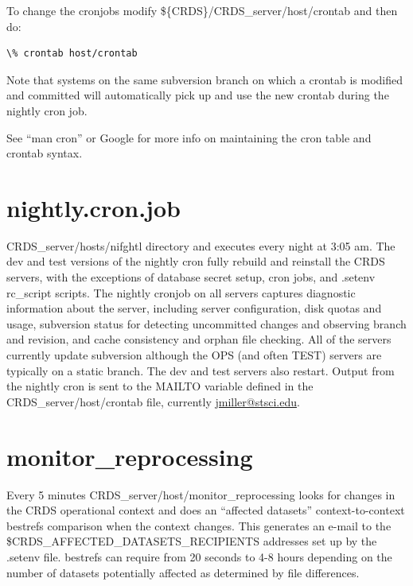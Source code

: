 \documentclass[letterpaper,10pt,english]{sphinxmanual}
\begin{document}
To change the cronjobs modify \$\{CRDS\}/CRDS\_server/host/crontab and then do:

\begin{Verbatim}[commandchars=\\\{\}]
\% crontab host/crontab
\end{Verbatim}

Note that systems on the same subversion branch on which a crontab is modified and committed will automatically pick
up and use the new crontab during the nightly cron job.

See ``man cron'' or Google for more info on maintaining the cron table and crontab syntax.


\section{nightly.cron.job}
\label{server_guide:nightly-cron-job}
CRDS\_server/hosts/nifghtl directory and executes every night at 3:05 am.  The dev and test versions
of the nightly cron fully rebuild and reinstall the CRDS servers,  with the exceptions of database secret setup,
cron jobs, and .setenv rc\_script scripts.   The nightly cronjob on all servers captures diagnostic information about
the server,  including server configuration, disk quotas and usage, subversion status for detecting uncommitted
changes and observing branch and revision, and cache consistency and orphan file checking.   All of the servers
currently update subversion although the OPS (and often TEST) servers are typically on a static branch.   The dev
and test servers also restart.  Output from the nightly cron is sent to the MAILTO variable defined in the
CRDS\_server/host/crontab file,  currently \href{mailto:jmiller@stsci.edu}{jmiller@stsci.edu}.


\section{monitor\_reprocessing}
\label{server_guide:id2}
Every 5 minutes CRDS\_server/host/monitor\_reprocessing looks for changes in the CRDS operational context and
does an ``affected datasets'' context-to-context bestrefs comparison when the context changes.   This generates
an e-mail to the \$CRDS\_AFFECTED\_DATASETS\_RECIPIENTS addresses set up by the .setenv file.   bestrefs can require
from 20 seconds to 4-8 hours depending on the number of datasets potentially affected as determined by file
differences.
\end{document}
